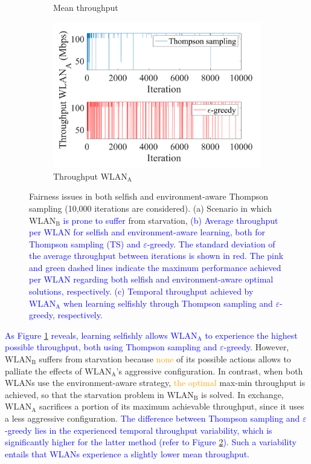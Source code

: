 \documentclass[preprint,12pt]{elsarticle}
\begin{document}
\begin{figure}[h!]
\begin{subfigure}[b]{0.36\linewidth}
		\caption{Mean throughput}\label{fig:scenario_1_new}
	\end{subfigure}
	\begin{subfigure}[b]{0.36\textwidth}
		\includegraphics[width=\textwidth]{experiment_2_1_variability}
		\caption{Throughput $\text{WLAN}_\text{A}$}
		\label{fig:experiment_2_1_variability}
	\end{subfigure}
	\caption{Fairness issues in both selfish and environment-aware Thompson sampling (10,000 iterations are considered). (a) Scenario in which $\text{WLAN}_\text{B}$ \textcolor{blue}{is prone to suffer} from starvation, \textcolor{blue}{(b) Average throughput per WLAN for selfish and environment-aware learning, both for Thompson sampling (TS) and $\varepsilon$-greedy. The standard deviation of the average throughput between iterations is shown in red. The pink and green dashed lines indicate the maximum performance achieved per WLAN regarding both selfish and environment-aware optimal solutions, respectively. (c) Temporal throughput achieved by $\text{WLAN}_\text{A}$ when learning selfishly through Thompson sampling and $\varepsilon$-greedy, respectively.}}
	\label{fig:selfish_learning_fairness_issue}
\end{figure}   	

\textcolor{blue}{As Figure \ref{fig:scenario_1_new} reveals, learning selfishly allows $\text{WLAN}_\text{A}$ to experience the highest possible throughput, both using Thompson sampling and $\varepsilon$-greedy.} However, $\text{WLAN}_\text{B}$ suffers from starvation because \textcolor{orange}{none} of its possible actions allows to palliate the effects of $\text{WLAN}_\text{A}$'s aggressive configuration. In contrast, when both WLANs use the environment-aware strategy, \textcolor{orange}{the optimal} max-min throughput is achieved, so that the starvation problem in $\text{WLAN}_\text{B}$ is solved. In exchange, $\text{WLAN}_\text{A}$ sacrifices a portion of its maximum achievable throughput, since it uses a less aggressive configuration. \textcolor{blue}{The difference between Thompson sampling and $\varepsilon$-greedy lies in the experienced temporal throughput variability, which is significantly higher for the latter method (refer to Figure \ref{fig:experiment_2_1_variability}). Such a variability entails that WLANs experience a slightly lower mean throughput.}
\end{document}
